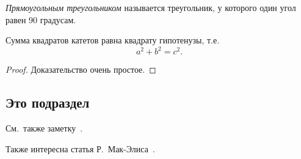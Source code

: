 \documentclass[example-notes.tex]{subfiles}
\begin{document}

    \begin{definition}
        \label{def:202211081146}
        \emph{Прямоугольным треугольником} называется треугольник, у которого один угол равен 90 градусам.
    \end{definition}

    \begin{theorem}
        \label{thm:202211081146}
        Сумма квадратов катетов равна квадрату гипотенузы, т.е.
        \begin{equation}
            \label{eq:202211081146:piphagor}
            a^2+b^2=c^2.
        \end{equation}
    \end{theorem}
    \begin{proof}
        Доказательство очень простое.
    \end{proof}

    \subsection{Это подраздел}\label{subsec:202211081146:this}

    \Blindtext

    \seealso
    См.~также заметку~.

    Также интересна статья Р.~Мак-Элиса~\cite{j.mceliece1978}.
\end{document}
